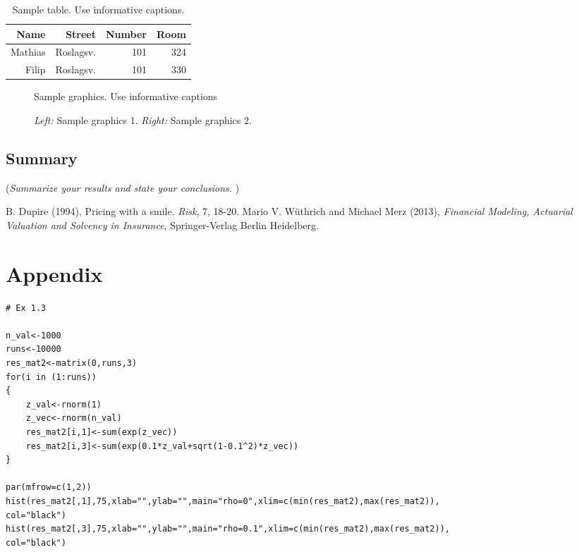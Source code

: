 \documentclass[11pt]{article}
\begin{document}
\begin{table}[!ht]
\center
\begin{tabular}{rrr|r}
Name & Street & Number & Room\\ 
\hline
Mathias & Roslagsv. & 101 & 324\\
Filip & Roslagsv. & 101 & 330\\
\hline
\end{tabular}
\caption{Sample table. Use informative captions.} \label{tab:sampletab}
\end{table}


 \begin{figure}[!ht]
 \center
  \caption{Sample graphics. Use informative captions}
  \label{fig:samplefig1}
\end{figure}


 \begin{figure}[!ht]
 \center
  \caption{\emph{Left:} Sample graphics 1. \emph{Right:} Sample graphics 2.}
  \label{fig:samplefig2}
\end{figure}


\subsection*{Summary}
({\it Summarize your results and state your conclusions. })



\begin{thebibliography}{99}
B. Dupire (1994),
Pricing with a smile.
\emph{Risk}, 7, 18-20.
  Mario V. W\"{u}thrich and Michael Merz (2013),
  \emph{Financial Modeling, Actuarial Valuation and Solvency in Insurance},
  Springer-Verlag Berlin Heidelberg.
\end{thebibliography}


\section*{Appendix}

\begin{verbatim}
# Ex 1.3

n_val<-1000
runs<-10000
res_mat2<-matrix(0,runs,3)
for(i in (1:runs))
{
	z_val<-rnorm(1)
	z_vec<-rnorm(n_val)
	res_mat2[i,1]<-sum(exp(z_vec))
	res_mat2[i,3]<-sum(exp(0.1*z_val+sqrt(1-0.1^2)*z_vec))
}

par(mfrow=c(1,2))
hist(res_mat2[,1],75,xlab="",ylab="",main="rho=0",xlim=c(min(res_mat2),max(res_mat2)),
col="black")
hist(res_mat2[,3],75,xlab="",ylab="",main="rho=0.1",xlim=c(min(res_mat2),max(res_mat2)),
col="black")
\end{verbatim}
\end{document}
